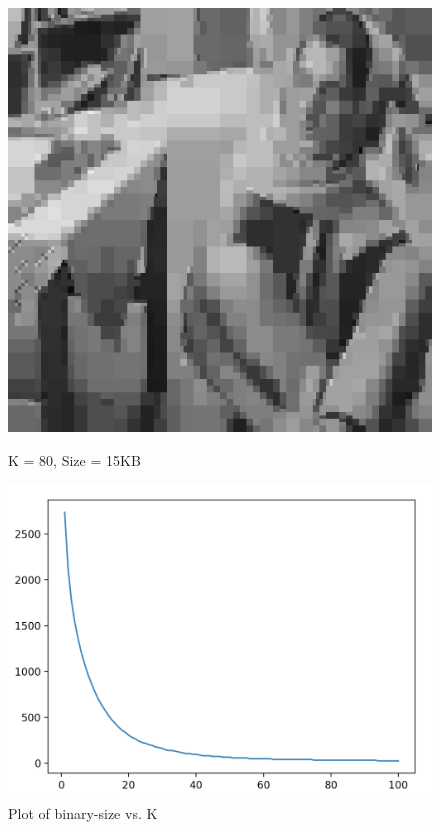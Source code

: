 \documentclass{article}
\begin{document}
    \begin{figure}[!htb]
      \includegraphics[scale=0.4]{./compression/1/80.png}
      \caption{K = 80, Size = 15KB}
    \endminipage \hfill
      \includegraphics[scale=.4]{./compression/plots/b.png}
      \caption{Plot of binary-size vs. K}
    \endminipage
    \end{figure}
    
\end{document}
